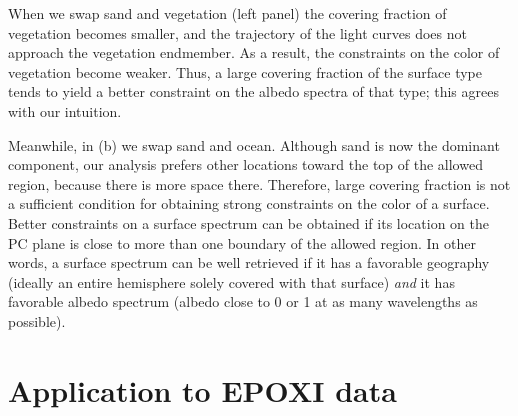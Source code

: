 \documentclass[iop,numberedappendix,apj]{emulateapj}
\begin{document}
When we swap sand and vegetation (left panel) the covering fraction of vegetation becomes smaller, and the trajectory of the light curves does not approach the vegetation endmember. As a result, the constraints on the color of vegetation become weaker. Thus, a large covering fraction of the surface type tends to yield a better constraint on the albedo spectra of that type; this agrees with our intuition.  

Meanwhile, in (b) we swap sand and ocean.  
Although sand is now the dominant component, 
our analysis prefers other locations toward the top of the allowed region, because there is more space there. 
Therefore, large covering fraction is not a sufficient condition for obtaining strong constraints on the color of a surface. 
Better constraints on a surface spectrum can be obtained if its location on the PC plane is close to more than one boundary of the allowed region. 
In other words, a surface spectrum can be well retrieved if it has a favorable geography (ideally an entire hemisphere solely covered with that surface) {\it and} it has favorable albedo spectrum (albedo close to 0 or 1 at as many wavelengths as possible). 



\section{Application to EPOXI data}
\label{s:EPOXI}
\end{document}
